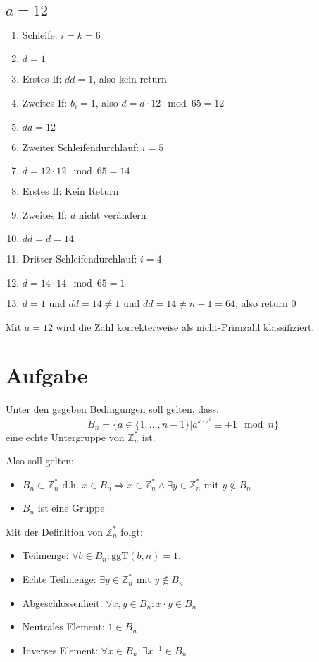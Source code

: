 \documentclass[DIN, pagenumber=false, fontsize=11pt, parskip=half]{scrartcl}
\begin{document}
    \subsection{$a=12$}
    \begin{enumerate}
        \item Schleife: $i=k=6$
        \item $d=1$
        \item Erstes If: $dd=1$, also kein return
        \item Zweites If: $b_i=1$, also $d = d \cdot 12 \mod 65 = 12$
        \item $dd = 12$
        \item Zweiter Schleifendurchlauf: $i=5$
        \item $d=12 \cdot 12 \mod 65 = 14$ 
        \item Erstes If: Kein Return
        \item Zweites If: $d$ nicht verändern
        \item $dd=d=14$
        \item Dritter Schleifendurchlauf: $i=4$
        \item $d=14 \cdot 14 \mod 65 = 1$
        \item $d=1$ und $dd = 14 \neq 1$ und $dd = 14 \neq n - 1 = 64$, also return 0
    \end{enumerate}
    Mit $a=12$ wird die Zahl korrekterweise als nicht-Primzahl klassifiziert.

    \section{Aufgabe}
    Unter den gegeben Bedingungen soll gelten, dass:
    \begin{equation}
        B_n = \{a \in \{1, \ldots, n-1\} | a^{k \cdot 2^i} \equiv \pm 1 \mod n\}
    \end{equation}
    eine echte Untergruppe von $\mathbb{Z}^*_n$ ist.

    Also soll gelten:
    \begin{itemize}
        \item $B_n \subset \mathbb{Z}^*_n$ d.h. $x \in B_n \Rightarrow x \in \mathbb{Z}^*_n \land \exists y \in \mathbb{Z}^*_n$ mit $y \notin B_n$
        \item $B_n$ ist eine Gruppe
    \end{itemize}

    Mit der Definition von $\mathbb{Z}^*_n$ folgt:
    \begin{itemize}
        \item Teilmenge: $\forall b \in B_n: \text{ggT}(b, n) = 1$.
        \item Echte Teilmenge: $\exists y \in \mathbb{Z}^*_n$ mit $y \notin B_n$
        \item Abgeschlossenheit: $\forall x, y \in B_n: x \cdot y \in B_n$
        \item Neutrales Element: $1 \in B_n$
        \item Inverses Element: $\forall x \in B_n: \exists x^{-1} \in B_n$
    \end{itemize}
\end{document}
